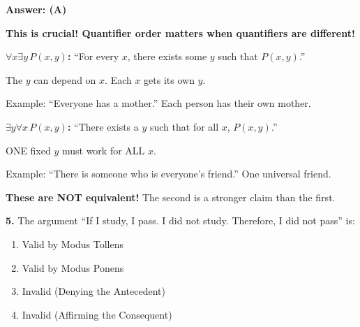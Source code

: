 \documentclass[11pt,a4paper]{article}
\begin{document}
\begin{solnbox}
\textbf{Answer: (A)}

\textbf{This is crucial! Quantifier order matters when quantifiers are different!}

\textbf{$\forall x \exists y\, P(x, y)$:} ``For every $x$, there exists some $y$ such that $P(x, y)$.''

The $y$ can depend on $x$. Each $x$ gets its own $y$.

Example: ``Everyone has a mother.'' Each person has their own mother.

\textbf{$\exists y \forall x\, P(x, y)$:} ``There exists a $y$ such that for all $x$, $P(x, y)$.''

ONE fixed $y$ must work for ALL $x$.

Example: ``There is someone who is everyone's friend.'' One universal friend.

\textbf{These are NOT equivalent!} The second is a stronger claim than the first.
\end{solnbox}

\vspace{10pt}

\textbf{5.} The argument ``If I study, I pass. I did not study. Therefore, I did not pass'' is:

\begin{enumerate}[label=(\Alph*),noitemsep]
    \item Valid by Modus Tollens
    \item Valid by Modus Ponens
    \item Invalid (Denying the Antecedent)
    \item Invalid (Affirming the Consequent)
\end{enumerate}
\end{document}
